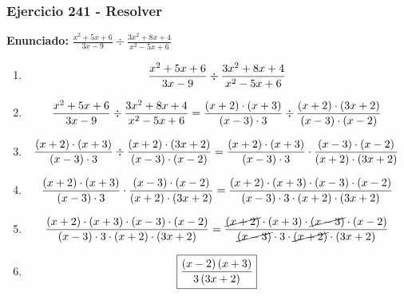 \documentclass[11pt,a4paper]{article}
\newcommand{\fitmath}[1]{%
\[
\setbox0=\hbox{$\displaystyle #1$}%
\ifdim\wd0>\linewidth
\resizebox{\linewidth}{!}{$\displaystyle #1$}%
\else
#1%
\fi
\]
}
\begin{document}
\subsubsection*{Ejercicio 241 - Resolver}
\textbf{Enunciado:} $ \frac{x^{2} + 5 x + 6}{3 x - 9} \div \frac{3 x^{2} + 8 x + 4}{x^{2} - 5 x + 6} $\par
\begin{enumerate}[leftmargin=2em]
\item \fitmath{\frac{x^{2} + 5 x + 6}{3 x - 9} \div \frac{3 x^{2} + 8 x + 4}{x^{2} - 5 x + 6}}
\item \fitmath{\frac{x^{2} + 5 x + 6}{3 x - 9} \div \frac{3 x^{2} + 8 x + 4}{x^{2} - 5 x + 6}= \frac{\left(x + 2\right)\cdot \left(x + 3\right)}{\left(x - 3\right)\cdot 3} \div \frac{\left(x + 2\right)\cdot \left(3 x + 2\right)}{\left(x - 3\right)\cdot \left(x - 2\right)}}
\item \fitmath{\frac{\left(x + 2\right)\cdot \left(x + 3\right)}{\left(x - 3\right)\cdot 3}\div \frac{\left(x + 2\right)\cdot \left(3 x + 2\right)}{\left(x - 3\right)\cdot \left(x - 2\right)}= \frac{\left(x + 2\right)\cdot \left(x + 3\right)}{\left(x - 3\right)\cdot 3}\cdot \frac{\left(x - 3\right)\cdot \left(x - 2\right)}{\left(x + 2\right)\cdot \left(3 x + 2\right)}}
\item \fitmath{\frac{\left(x + 2\right)\cdot \left(x + 3\right)}{\left(x - 3\right)\cdot 3}\cdot \frac{\left(x - 3\right)\cdot \left(x - 2\right)}{\left(x + 2\right)\cdot \left(3 x + 2\right)}= \frac{\left(x + 2\right)\cdot \left(x + 3\right)\cdot \left(x - 3\right)\cdot \left(x - 2\right)}{\left(x - 3\right)\cdot 3\cdot \left(x + 2\right)\cdot \left(3 x + 2\right)}}
\item \fitmath{\frac{\left(x + 2\right)\cdot \left(x + 3\right)\cdot \left(x - 3\right)\cdot \left(x - 2\right)}{\left(x - 3\right)\cdot 3\cdot \left(x + 2\right)\cdot \left(3 x + 2\right)}= \frac{\cancel{\left(x + 2\right)}\cdot \left(x + 3\right)\cdot \cancel{\left(x - 3\right)}\cdot \left(x - 2\right)}{\cancel{\left(x - 3\right)}\cdot 3\cdot \cancel{\left(x + 2\right)}\cdot \left(3 x + 2\right)}}
\item \fitmath{\boxed{\frac{\left(x - 2\right) \left(x + 3\right)}{3 \left(3 x + 2\right)}}}
\end{enumerate}

\vspace{0.12cm}
\end{document}
